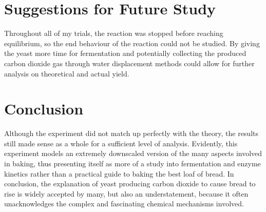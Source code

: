 \documentclass{article}
\begin{document}
\section{Suggestions for Future Study}
Throughout all of my trials, the reaction was stopped before reaching equilibrium, so the end behaviour of the reaction could not be studied. By giving the yeast more time for fermentation and potentially collecting the produced carbon dioxide gas through water displacement methods could allow for further analysis on theoretical and actual yield.

\section{Conclusion}
Although the experiment did not match up perfectly with the theory, the results still made sense as a whole for a sufficient level of analysis. Evidently, this experiment models an extremely downscaled version of the many aspects involved in baking, thus presenting itself as more of a study into fermentation and enzyme kinetics rather than a practical guide to baking the best loaf of bread. In conclusion, the explanation of yeast producing carbon dioxide to cause bread to rise is widely accepted by many, but also an understatement, because it often unacknowledges the complex and fascinating chemical mechanisms involved.

\nocite{*}

\newpage

\printbibliography

\newpage

\captionsetup[table]{name=Appendix}
\setcounter{table}{0}
\end{document}
